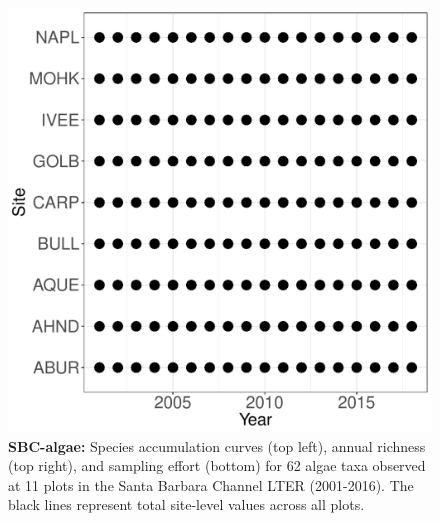 \documentclass[11pt, oneside]{article}
\begin{document}
\begin{figure}[h!]
\includegraphics[scale = 0.4]{sbc-algae-castorani_spatiotemporal_sampling_effort.pdf}

\caption{{\bf SBC-algae:} Species accumulation curves (top left),  annual richness (top right), and sampling effort (bottom)  for 62 algae taxa observed at 11 plots in the Santa Barbara Channel LTER (2001-2016). The black lines represent total site-level values across all plots.}
\label{sbc-algae}
\end{figure}
\end{document}
